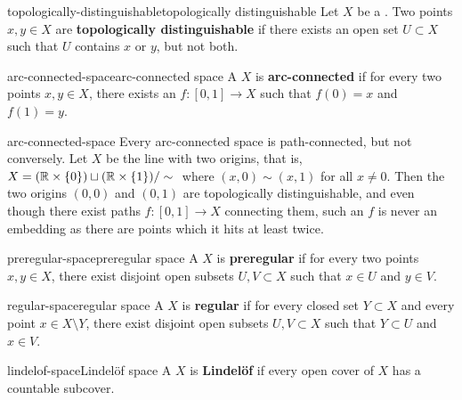 \begin{topic}{topologically-distinguishable}{topologically distinguishable}
    Let $X$ be a . Two points $x, y \in X$ are \textbf{topologically distinguishable} if there exists an open set $U \subset X$ such that $U$ contains $x$ or $y$, but not both.
\end{topic}

\begin{topic}{arc-connected-space}{arc-connected space}
    A  $X$ is \textbf{arc-connected} if for every two  points $x, y \in X$, there exists an  $f : [0, 1] \to X$ such that $f(0) = x$ and $f(1) = y$.
\end{topic}

\begin{example}{arc-connected-space}
    Every arc-connected space is path-connected, but not conversely. Let $X$ be the line with two origins, that is, $X = (\mathbb{R} \times \{ 0 \}) \sqcup (\mathbb{R} \times \{ 1 \}) / \sim{}$ where $(x, 0) \sim{} (x, 1)$ for all $x \ne 0$. Then the two origins $(0, 0)$ and $(0, 1)$ are topologically distinguishable, and even though there exist paths $f : [0, 1] \to X$ connecting them, such an $f$ is never an embedding as there are points which it hits at least twice.
\end{example}

\begin{topic}{preregular-space}{preregular space}
    A  $X$ is \textbf{preregular} if for every two  points $x, y \in X$, there exist disjoint open subsets $U, V \subset X$ such that $x \in U$ and $y \in V$.
\end{topic}

\begin{topic}{regular-space}{regular space}
    A  $X$ is \textbf{regular} if for every closed set $Y \subset X$ and every point $x \in X \setminus Y$, there exist disjoint open subsets $U, V \subset X$ such that $Y \subset U$ and $x \in V$.
\end{topic}

\begin{topic}{lindelof-space}{Lindelöf space}
    A  $X$ is \textbf{Lindelöf} if every open cover of $X$ has a countable subcover.
\end{topic}

